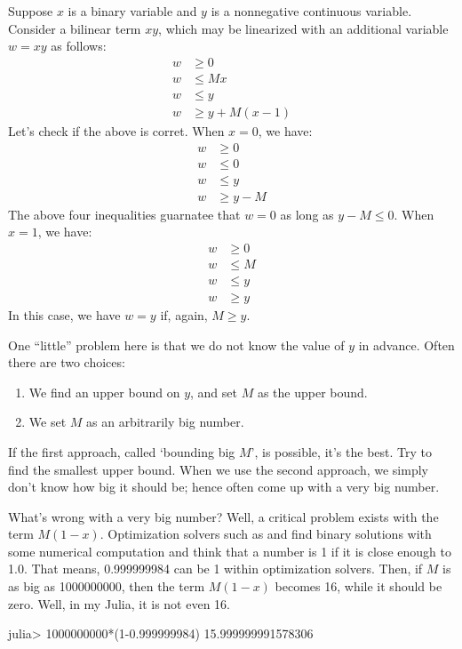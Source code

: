 Suppose $x$ is a binary variable and $y$ is a nonnegative continuous variable. Consider a bilinear term $xy$, which may be linearized with an additional variable $w=xy$ as follows:
\begin{align*}
	w &\geq 0 \\
	w &\leq M x \\
	w &\leq y \\
	w &\geq y + M(x-1)
\end{align*}
Let's check if the above is corret. When $x=0$, we have:
\begin{align*}
	w &\geq 0 \\
	w &\leq 0 \\
	w &\leq y \\
	w &\geq y - M
\end{align*}
The above four inequalities guarnatee that $w=0$ as long as $y-M\leq 0$. When $x=1$, we have:
\begin{align*}
	w &\geq 0 \\
	w &\leq M \\
	w &\leq y \\
	w &\geq y
\end{align*}
In this case, we have $w=y$ if, again, $M \geq y$.

One ``little'' problem here is that we do not know the value of $y$ in advance. Often there are two choices:
\begin{enumerate}
\item We find an upper bound on $y$, and set $M$ as the upper bound.
\item We set $M$ as an arbitrarily big number.
\end{enumerate}
If the first approach, called `bounding big $M$', is possible, it's the best. Try to find the smallest upper bound. When we use the second approach, we simply don't know how big it should be; hence often come up with a very big number.

What's wrong with a very big number? Well, a critical problem exists with the term $M(1-x)$. Optimization solvers such as \gurobi{} and \cplex{} find binary solutions with some numerical computation and think that a number is 1 if it is close enough to 1.0. That means, 0.999999984 can be 1 within optimization solvers. Then, if $M$ is as big as 1000000000, then the term $M(1-x)$ becomes 16, while it should be zero. Well, in my Julia, it is not even 16.
\begin{code}
julia> 1000000000*(1-0.999999984)
15.999999991578306
\end{code}

